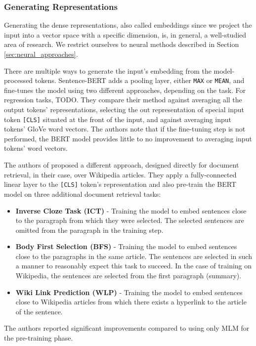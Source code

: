 \subsubsection{Generating Representations}

Generating the dense representations, also called embeddings since we project the input into a vector space with a specific dimension, is, in general, a well-studied area of research. We restrict ourselves to neural methods described in Section \ref{sec:neural_approaches}. 

There are multiple ways to generate the input's embedding from the model-processed tokens.
Sentence-BERT \citep{sbert} adds a pooling layer, either \texttt{MAX} or \texttt{MEAN}, and fine-tunes the model using two different approaches, depending on the task.
For regression tasks, TODO.
They compare their method against averaging all the output tokens' representations, selecting the out representation of special input token \texttt{[CLS]} situated at the front of the input, and against averaging input tokens' GloVe \citep{glove} word vectors.
The authors note that if the fine-tuning step is not performed, the BERT model provides little to no improvement to averaging input tokens' word vectors.

The authors of \citep{two-tower} proposed a different approach, designed directly for document retrieval, in their case, over Wikipedia articles. 
They apply a fully-connected linear layer to the \texttt{[CLS]} token's representation and also pre-train the BERT model on three additional document retrieval tasks:
\begin{itemize}
        \item \textbf{Inverse Cloze Task (ICT)} - Training the model to embed sentences close to the paragraph from which they were selected. The selected sentences are omitted from the paragraph in the training step.
        \item \textbf{Body First Selection (BFS)} - Training the model to embed sentences close to the paragraphs in the same article. The sentences are selected in such a manner to reasonably expect this task to succeed. In the case of training on Wikipedia, the sentences are selected from the first paragraph (summary).
        \item \textbf{Wiki Link Prediction (WLP)} - Training the model to embed sentences close to Wikipedia articles from which there exists a hyperlink to the article of the sentence.
\end{itemize}
The authors reported significant improvements compared to using only MLM for the pre-training phase.

